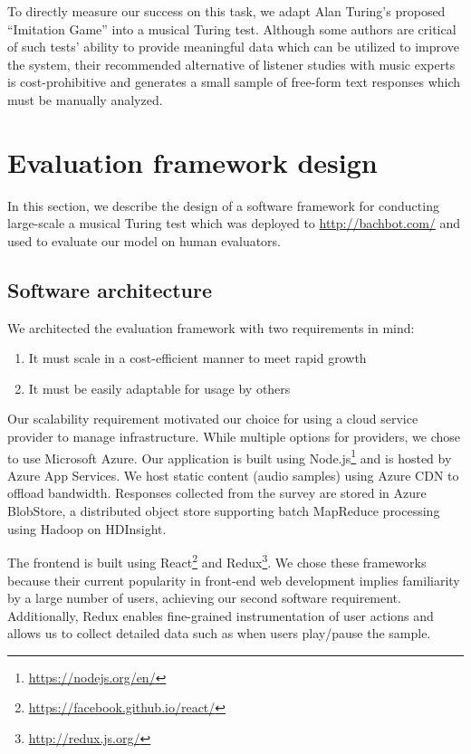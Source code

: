 To directly measure our success on this task, we adapt Alan Turing's proposed
``Imitation Game'' \citep{turing1950computing} into a musical Turing test.
Although some authors \citep{ariza2009interrogator} are critical of such tests'
ability to provide meaningful data which can be utilized to improve the system,
their recommended alternative of listener studies with music experts is
cost-prohibitive and generates a small sample of free-form text responses which
must be manually analyzed.

\section{Evaluation framework design}

In this section, we describe the design of a software framework for conducting
large-scale a musical Turing test which was deployed to \url{http://bachbot.com/}
and used to evaluate our model on human evaluators.

\subsection{Software architecture}

We architected the evaluation framework with two requirements in mind:
\begin{enumerate}
  \item It must scale in a cost-efficient manner to meet rapid growth
  \item It must be easily adaptable for usage by others
\end{enumerate}

Our scalability requirement motivated our choice for using a cloud service
provider to manage infrastructure. While multiple options for providers, we
chose to use Microsoft Azure. Our application is built using
Node.js\footnote{\url{https://nodejs.org/en/}} and is hosted by Azure App
Services. We host static content (\eg audio samples) using Azure CDN to offload
bandwidth. Responses collected from the survey are stored in Azure BlobStore, a
distributed object store supporting batch MapReduce processing using Hadoop on
HDInsight.

The frontend is built using
React\footnote{\url{https://facebook.github.io/react/}} and
Redux\footnote{\url{http://redux.js.org/}}. We chose these frameworks because
their current popularity in front-end web development implies familiarity by a
large number of users, achieving our second software requirement. Additionally,
Redux enables fine-grained instrumentation of user actions and allows us to
collect detailed data such as when users play/pause the sample.

